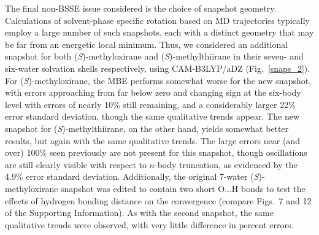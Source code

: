         The final non-BSSE issue considered is the choice of snapshot geometry. Calculations
of solvent-phase specific rotation based on MD trajectories typically employ a large number
of such snapshots, each with a distinct geometry that may be far from an energetic local
minimum.  Thus, we considered an additional snapshot for both (\textit{S})-methyloxirane and
(\textit{S})-methylthiirane in their seven- and six-water solvation shells respectively,
using CAM-B3LYP/aDZ (Fig.~\ref{snaps_2}). For (\textit{S})-methyloxirane, the MBE performs
somewhat worse for the new snapshot, with errors approaching from far below zero and
changing sign at the six-body level with errors of nearly 10\% still remaining, and a
considerably larger 22\% error standard deviation, though the same qualitative trends
appear. The new snapshot for (\textit{S})-methylthiirane, on the other hand, yields somewhat
better results, but again with the same qualitative trends.  The large errors near (and
over) 100\% seen previously are not present for this snapshot, though oscillations are still
clearly visible with respect to $n$-body truncation, as evidenced by the 4.9\% error
standard deviation. Additionally, the original 7-water (\textit{S})-methyloxirane snapshot
was edited to contain two short O...H bonds to test the effects of hydrogen bonding distance
on the convergence (compare Figs.~7 and 12 of the Supporting Information). As with the second snapshot, the same qualitative trends were observed, with very little difference in percent errors.

